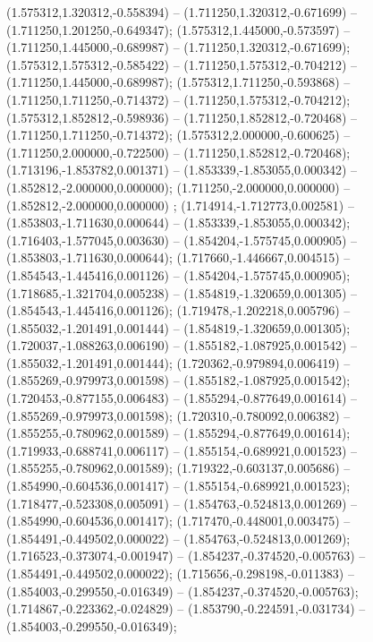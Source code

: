  (1.575312,1.320312,-0.558394) -- (1.711250,1.320312,-0.671699) -- (1.711250,1.201250,-0.649347);
 (1.575312,1.445000,-0.573597) -- (1.711250,1.445000,-0.689987) -- (1.711250,1.320312,-0.671699);
 (1.575312,1.575312,-0.585422) -- (1.711250,1.575312,-0.704212) -- (1.711250,1.445000,-0.689987);
 (1.575312,1.711250,-0.593868) -- (1.711250,1.711250,-0.714372) -- (1.711250,1.575312,-0.704212);
 (1.575312,1.852812,-0.598936) -- (1.711250,1.852812,-0.720468) -- (1.711250,1.711250,-0.714372);
 (1.575312,2.000000,-0.600625) -- (1.711250,2.000000,-0.722500) -- (1.711250,1.852812,-0.720468);
 (1.713196,-1.853782,0.001371) -- (1.853339,-1.853055,0.000342) -- (1.852812,-2.000000,0.000000);
 (1.711250,-2.000000,0.000000) -- (1.852812,-2.000000,0.000000) ;
 (1.714914,-1.712773,0.002581) -- (1.853803,-1.711630,0.000644) -- (1.853339,-1.853055,0.000342);
 (1.716403,-1.577045,0.003630) -- (1.854204,-1.575745,0.000905) -- (1.853803,-1.711630,0.000644);
 (1.717660,-1.446667,0.004515) -- (1.854543,-1.445416,0.001126) -- (1.854204,-1.575745,0.000905);
 (1.718685,-1.321704,0.005238) -- (1.854819,-1.320659,0.001305) -- (1.854543,-1.445416,0.001126);
 (1.719478,-1.202218,0.005796) -- (1.855032,-1.201491,0.001444) -- (1.854819,-1.320659,0.001305);
 (1.720037,-1.088263,0.006190) -- (1.855182,-1.087925,0.001542) -- (1.855032,-1.201491,0.001444);
 (1.720362,-0.979894,0.006419) -- (1.855269,-0.979973,0.001598) -- (1.855182,-1.087925,0.001542);
 (1.720453,-0.877155,0.006483) -- (1.855294,-0.877649,0.001614) -- (1.855269,-0.979973,0.001598);
 (1.720310,-0.780092,0.006382) -- (1.855255,-0.780962,0.001589) -- (1.855294,-0.877649,0.001614);
 (1.719933,-0.688741,0.006117) -- (1.855154,-0.689921,0.001523) -- (1.855255,-0.780962,0.001589);
 (1.719322,-0.603137,0.005686) -- (1.854990,-0.604536,0.001417) -- (1.855154,-0.689921,0.001523);
 (1.718477,-0.523308,0.005091) -- (1.854763,-0.524813,0.001269) -- (1.854990,-0.604536,0.001417);
 (1.717470,-0.448001,0.003475) -- (1.854491,-0.449502,0.000022) -- (1.854763,-0.524813,0.001269);
 (1.716523,-0.373074,-0.001947) -- (1.854237,-0.374520,-0.005763) -- (1.854491,-0.449502,0.000022);
 (1.715656,-0.298198,-0.011383) -- (1.854003,-0.299550,-0.016349) -- (1.854237,-0.374520,-0.005763);
 (1.714867,-0.223362,-0.024829) -- (1.853790,-0.224591,-0.031734) -- (1.854003,-0.299550,-0.016349);
